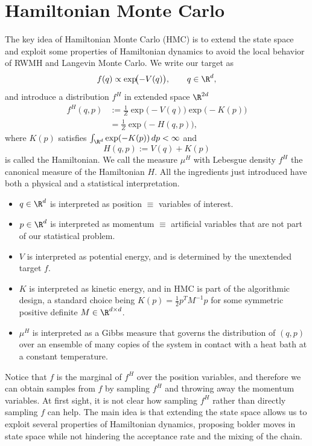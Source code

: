 \chapter{Hamiltonian Monte Carlo}
\label{ch:hmc}


The key idea of Hamiltonian Monte Carlo (HMC) is to extend the state space and exploit some
properties of Hamiltonian dynamics to avoid the local behavior of RWMH and Langevin Monte
Carlo. We write our target as
\[
f(q) \propto \exp\!\bigl(-V(q)\bigr), \qquad q \in \R^d,
\]
and introduce a distribution $f^H$ in extended space $\R^{2d}$
\begin{equation}
\label{eq:8.1}
\begin{aligned}
f^H(q,p) &:= \frac{1}{Z}\exp\!\bigl(-V(q)\bigr)\exp\!\bigl(-K(p)\bigr) \\
          &= \frac{1}{Z}\exp\!\bigl(-H(q,p)\bigr),
\end{aligned}
\end{equation}
where $K(p)$ satisfies $\int_{\R^d} \exp(-K(p))\,dp < \infty$ and
\[
H(q,p) := V(q) + K(p)
\]
is called the Hamiltonian. We call the measure $\mu^H$ with Lebesgue density $f^H$ the
canonical measure of the Hamiltonian $H$. All the ingredients just introduced have both a
physical and a statistical interpretation.
\begin{itemize}
  \item $q \in \R^d$ is interpreted as position $\equiv$ variables of interest.
  \item $p \in \R^d$ is interpreted as momentum $\equiv$ artificial variables that are not
    part of our statistical problem.
  \item $V$ is interpreted as potential energy, and is determined by the unextended target $f$.
  \item $K$ is interpreted as kinetic energy, and in HMC is part of the algorithmic design, a
    standard choice being $K(p) = \frac{1}{2}p^T M^{-1}p$ for some symmetric positive definite
    $M \in \R^{d\times d}$.
  \item $\mu^H$ is interpreted as a Gibbs measure that governs the distribution of $(q,p)$
    over an ensemble of many copies of the system in contact with a heat bath at a constant
    temperature.
\end{itemize}

Notice that $f$ is the marginal of $f^H$ over the position variables, and therefore we can
obtain samples from $f$ by sampling $f^H$ and throwing away the momentum variables. At first
sight, it is not clear how sampling $f^H$ rather than directly sampling $f$ can help. The main
idea is that extending the state space allows us to exploit several properties of Hamiltonian
dynamics, proposing bolder moves in state space while not hindering the acceptance rate and the
mixing of the chain.





